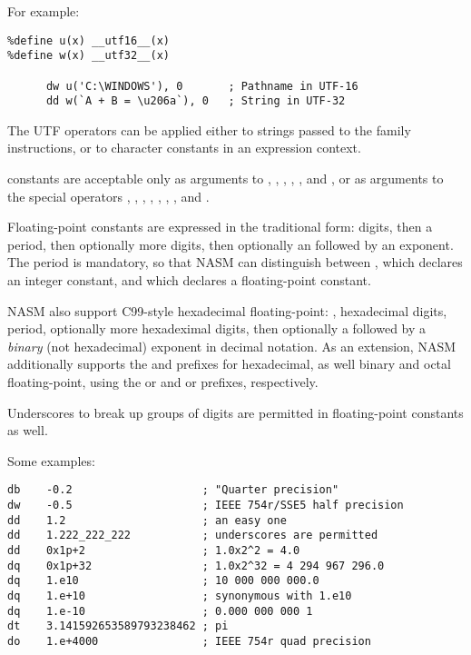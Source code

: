 For example:

\begin{lstlisting}
%define u(x) __utf16__(x)
%define w(x) __utf32__(x)

      dw u('C:\WINDOWS'), 0       ; Pathname in UTF-16
      dd w(`A + B = \u206a`), 0   ; String in UTF-32
\end{lstlisting}

The UTF operators can be applied either to strings passed to the
 family instructions, or to character constants in an expression
context.


 constants are acceptable only as arguments to
, , , , ,
and , or as arguments to the special operators ,
, , ,
, , ,
and .

Floating-point constants are expressed in the traditional form:
digits, then a period, then optionally more digits, then optionally an
 followed by an exponent. The period is mandatory, so that NASM
can distinguish between , which declares an integer constant,
and  which declares a floating-point constant.

NASM also support C99-style hexadecimal floating-point: ,
hexadecimal digits, period, optionally more hexadeximal digits, then
optionally a  followed by a \emph{binary} (not hexadecimal)
exponent in decimal notation. As an extension, NASM additionally
supports the  and \code{\$} prefixes for hexadecimal,
as well binary and octal floating-point, using the  or
 and  or  prefixes, respectively.

Underscores to break up groups of digits are permitted in
floating-point constants as well.

Some examples:

\begin{lstlisting}
db    -0.2                    ; "Quarter precision"
dw    -0.5                    ; IEEE 754r/SSE5 half precision
dd    1.2                     ; an easy one
dd    1.222_222_222           ; underscores are permitted
dd    0x1p+2                  ; 1.0x2^2 = 4.0
dq    0x1p+32                 ; 1.0x2^32 = 4 294 967 296.0
dq    1.e10                   ; 10 000 000 000.0
dq    1.e+10                  ; synonymous with 1.e10
dq    1.e-10                  ; 0.000 000 000 1
dt    3.141592653589793238462 ; pi
do    1.e+4000                ; IEEE 754r quad precision
\end{lstlisting}

